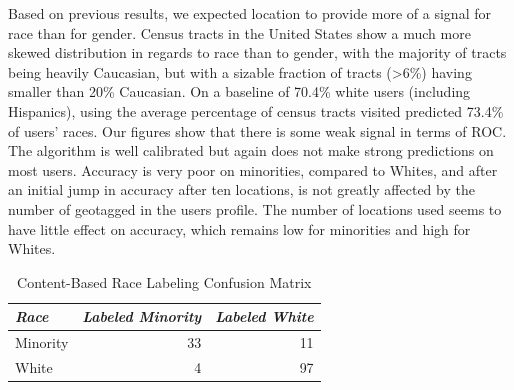 Based on previous results, we expected location to provide more of a signal for race than for gender.
Census tracts in the United States show a much more skewed distribution in regards to race than to gender, with the majority of tracts being heavily Caucasian, but with a sizable fraction of tracts (>6\%) having smaller than 20\% Caucasian. 
On a baseline of 70.4\% white users (including Hispanics), using the average percentage of census tracts visited predicted 73.4\% of users' races.
Our figures show that there is some weak signal in terms of ROC.
The algorithm is well calibrated but again does not make strong predictions on most users.
Accuracy is very poor on minorities, compared to Whites, and after an initial jump in accuracy after ten locations, is not greatly affected by the number of geotagged in the users profile.
The number of locations used seems to have little effect on accuracy, which remains low for minorities and high for Whites.



\begin{table}[h]
\centering
\begin{tabular}{l r r}
\emph{Race} & \emph{Labeled Minority} & \emph{Labeled White} \\ \hline
Minority & 33 & 11 \\
White & 4 & 97 \\
\end{tabular}
\caption{Content-Based Race Labeling Confusion Matrix\label{tab:cm_race_face}}
\end{table}

